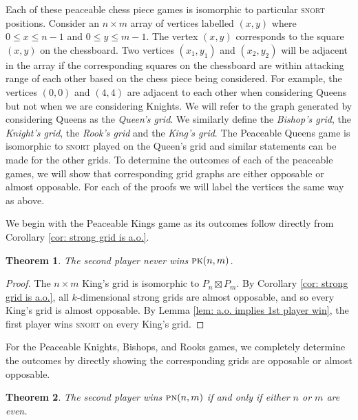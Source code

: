 \documentclass[11pt]{article}
\newtheorem{theorem}{Theorem}[section]
\theoremstyle{definition}
\begin{document}
Each of these peaceable chess piece games is isomorphic to particular
\textsc{snort} positions. Consider an $n\times m$ array of vertices labelled
$(x,y)$ where $0\leq x\leq n-1$ and $0\leq y\leq m-1$. The vertex $(x,y)$
corresponds to the square $(x,y)$ on the chessboard. Two vertices $(x_1, y_1)$
and $(x_2, y_2)$ will be adjacent in the array if the corresponding squares on
the chessboard are within attacking range of each other based on the chess
piece being considered. For example, the vertices $(0,0)$ and $(4,4)$ are
adjacent to each other when considering Queens but not when we are considering
Knights. We will refer to the graph generated by considering Queens as the
\emph{Queen's grid}. We similarly define the \emph{Bishop's grid}, the
\emph{Knight's grid}, the \emph{Rook's grid} and the \emph{King's grid}. The
Peaceable Queens game is isomorphic to \textsc{snort} played on the Queen's
grid and similar statements can be made for the other grids. To determine the
outcomes of each of the peaceable games, we will show that corresponding grid
graphs are either opposable or almost opposable. For each of the proofs we will
label the vertices the same way as above.

We begin with the Peaceable Kings game as its outcomes follow directly from
Corollary \ref{cor: strong grid is a.o.}.

\begin{theorem}
    \label{thm: PK outcomes}
    The second player never wins $\textsc{pk}(n,m)$. 
\end{theorem}

\begin{proof}
    The $n\times m$ King's grid is isomorphic to $P_n \boxtimes P_m$. By
    Corollary \ref{cor: strong grid is a.o.}, all $k$-dimensional strong grids
    are almost opposable, and so every King's grid is almost opposable. By
    Lemma \ref{lem: a.o. implies 1st player win}, the first player wins
    \textsc{snort} on every King's grid. 
\end{proof}

For the Peaceable Knights, Bishops, and Rooks games, we completely determine
the outcomes by directly showing the corresponding grids are opposable or
almost opposable.

\begin{theorem}
    \label{thm: PN outcomes}
    The second player wins $\textsc{pn}(n,m)$ if and only if either $n$ or $m$
    are even.
\end{theorem}
\end{document}

